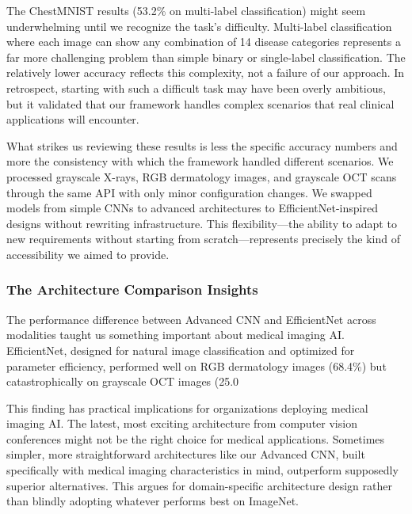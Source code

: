 \documentclass[12pt,a4paper]{article}
\begin{document}
The ChestMNIST results (53.2\% on multi-label classification) might seem underwhelming until we recognize the task's difficulty. Multi-label classification where each image can show any combination of 14 disease categories represents a far more challenging problem than simple binary or single-label classification. The relatively lower accuracy reflects this complexity, not a failure of our approach. In retrospect, starting with such a difficult task may have been overly ambitious, but it validated that our framework handles complex scenarios that real clinical applications will encounter.

What strikes us reviewing these results is less the specific accuracy numbers and more the consistency with which the framework handled different scenarios. We processed grayscale X-rays, RGB dermatology images, and grayscale OCT scans through the same API with only minor configuration changes. We swapped models from simple CNNs to advanced architectures to EfficientNet-inspired designs without rewriting infrastructure. This flexibility—the ability to adapt to new requirements without starting from scratch—represents precisely the kind of accessibility we aimed to provide.

\subsubsection{The Architecture Comparison Insights}

The performance difference between Advanced CNN and EfficientNet across modalities taught us something important about medical imaging AI. EfficientNet, designed for natural image classification and optimized for parameter efficiency, performed well on RGB dermatology images (68.4\%) but catastrophically on grayscale OCT images (25.0%

This finding has practical implications for organizations deploying medical imaging AI. The latest, most exciting architecture from computer vision conferences might not be the right choice for medical applications. Sometimes simpler, more straightforward architectures like our Advanced CNN, built specifically with medical imaging characteristics in mind, outperform supposedly superior alternatives. This argues for domain-specific architecture design rather than blindly adopting whatever performs best on ImageNet.
\end{document}
